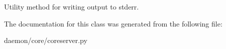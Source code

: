 \begin{DoxyVerb}Utility method for writing output to stderr.
\end{DoxyVerb}
 

The documentation for this class was generated from the following file\+:\begin{DoxyCompactItemize}
\item 
daemon/core/coreserver.\+py\end{DoxyCompactItemize}
